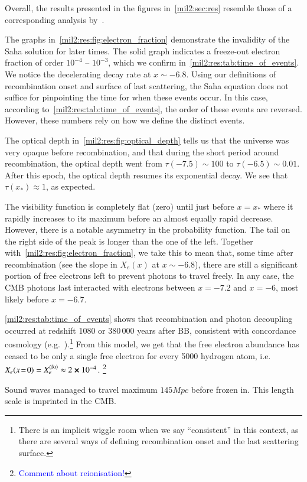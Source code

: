 



Overall, the results presented in the figures in~\cref{mil2:sec:res} resemble those of a corresponding analysis by~\citet[see][Fig.~1,~2]{Callin2006}.


The graphs in~\cref{mil2:res:fig:electron_fraction} demonstrate the invalidity of the Saha solution for later times. The solid graph indicates a freeze-out electron fraction of order $10^{-4}$ -- $10^{-3}$, which we confirm in~\cref{mil2:res:tab:time_of_events}. We notice the decelerating decay rate at $x\sim -6.8$. Using our definitions of recombination onset and surface of last scattering, the Saha equation does not suffice for pinpointing the time for when these events occur. In this case, according to~\cref{mil2:res:tab:time_of_events}, the order of these events are reversed. However, these numbers rely on how we define the distinct events.

The optical depth in~\cref{mil2:res:fig:optical_depth} tells us that the universe was very opaque before recombination, and that during the short period around recombination, the optical depth went from $\tau(-7.5)\sim 100$ to $\tau( -6.5)\sim 0.01$. After this epoch, the optical depth resumes its exponential decay. We see that $\tau(x_*)\approx 1$, as expected. 


The visibility function is completely flat (zero) until just before $x=x_*$ where it rapidly increases to its maximum before an almost equally rapid decrease. However, there is a notable asymmetry in the probability function. The tail on the right side of the peak is longer than the one of the left. Together with~\cref{mil2:res:fig:electron_fraction}, we take this to mean that, some time after recombination (see the slope in $X_e(x)$ at $x\sim -6.8$), there are still a significant portion of free electrons left to prevent photons to travel freely. In any case, the CMB photons last interacted with electrons between $x=-7.2$ and $x=-6$, most likely before $x=-6.7$.

\cref{mil2:res:tab:time_of_events} shows that recombination and photon decoupling occurred at redshift 1080 or 380\,000 years after BB, consistent with concordance cosmology (e.g.~\citet[Tab.~3.1]{Baumann}).\footnote{There is an implicit wiggle room when we say ``consistent'' in this context, as there are several ways of defining recombination onset and the last scattering surface.} From this model, we get that the free electron abundance has ceased to be only a single free electron for every 5000 hydrogen atom, i.e. $X_e(x\!=\!0) = X_e^\mathrm{(fo)}\approx 2\cross 10^{-4}$. \footnote{\textcolor{blue}{Comment about reionisation!}}

Sound waves managed to travel maximum $145\unit{Mpc}$ before frozen in. This length scale is imprinted in the CMB. 